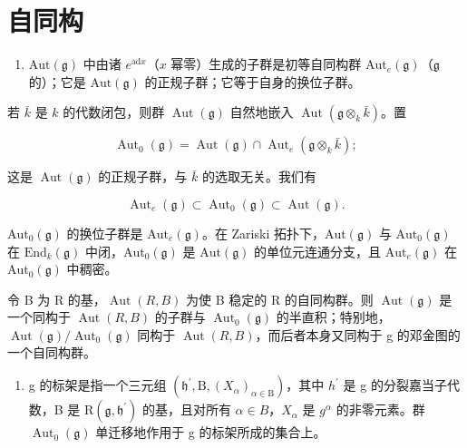 \section*{自同构}

\begin{enumerate}
\def\labelenumi{\arabic{enumi})}
\setcounter{enumi}{15}
\tightlist
\item
  \(\mathrm{Aut}(\mathfrak{g})\) 中由诸 \(e^{\mathrm{ad}x}\)（\(x\) 幂零）生成的子群是初等自同构群 \(\mathrm{Aut}_e(\mathfrak{g})\)（\(\mathfrak{g}\) 的）；它是 \(\mathrm{Aut}(\mathfrak{g})\) 的正规子群；它等于自身的换位子群。
\end{enumerate}

若 \(\bar{k}\) 是 \(k\) 的代数闭包，则群 \(\operatorname{Aut}(\mathfrak{g})\) 自然地嵌入 \(\operatorname{Aut}(\mathfrak{g} \otimes_k \bar{k})\)。置

\[
\operatorname{Aut} _ {0} (\mathfrak {g}) = \operatorname{Aut} (\mathfrak {g}) \cap \operatorname{Aut} _ {e} (\mathfrak {g} \otimes_ {k} \bar {k});
\]

这是 \(\operatorname{Aut}(\mathfrak{g})\) 的正规子群，与 \(\bar{k}\) 的选取无关。我们有

\[
\operatorname{Aut} _ {e} (\mathfrak {g}) \subset \operatorname{Aut} _ {0} (\mathfrak {g}) \subset \operatorname{Aut} (\mathfrak {g}).
\]

\(\mathrm{Aut}_0(\mathfrak{g})\) 的换位子群是 \(\mathrm{Aut}_e(\mathfrak{g})\)。在 Zariski 拓扑下，\(\mathrm{Aut}(\mathfrak{g})\) 与 \(\mathrm{Aut}_0(\mathfrak{g})\) 在 \(\mathrm{End}_k(\mathfrak{g})\) 中闭，\(\mathrm{Aut}_0(\mathfrak{g})\) 是 \(\mathrm{Aut}(\mathfrak{g})\) 的单位元连通分支，且 \(\mathrm{Aut}_e(\mathfrak{g})\) 在 \(\mathrm{Aut}_0(\mathfrak{g})\) 中稠密。

令 B 为 R 的基，\(\operatorname{Aut}(R,B)\) 为使 B 稳定的 R 的自同构群。则 \(\operatorname{Aut}(\mathfrak{g})\) 是一个同构于 \(\operatorname{Aut}(R,B)\) 的子群与 \(\operatorname{Aut}_{0}(\mathfrak{g})\) 的半直积；特别地，\(\operatorname{Aut}(\mathfrak{g})/\operatorname{Aut}_{0}(\mathfrak{g})\) 同构于 \(\operatorname{Aut}(R,B)\)，而后者本身又同构于 g 的邓金图的一个自同构群。

\begin{enumerate}
\def\labelenumi{\arabic{enumi})}
\setcounter{enumi}{16}
\tightlist
\item
  g 的标架是指一个三元组 \((\mathfrak{h}^{\prime},\mathrm{B},(X_{\alpha})_{\alpha\in\mathrm{B}})\)，其中 \(h^{\prime}\) 是 g 的分裂嘉当子代数，B 是 \(\mathrm{R}(\mathfrak{g},\mathfrak{h}^{\prime})\) 的基，且对所有 \(\alpha\in B\)，\(X_{\alpha}\) 是 \(g^{\alpha}\) 的非零元素。群 \(\operatorname{Aut}_{0}(\mathfrak{g})\) 单迁移地作用于 g 的标架所成的集合上。
\end{enumerate}

